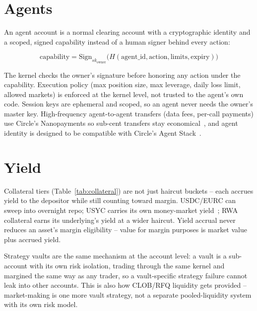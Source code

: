 \documentclass[11pt,a4paper]{article}
\begin{document}
\section{Agents}
\label{sec:agents}

An agent account is a normal clearing account with a cryptographic identity and a scoped, signed capability instead of a human signer behind every action:

\[
\text{capability} = \text{Sign}_{sk_{\text{owner}}}\big(H(\text{agent\_id}, \text{action}, \text{limits}, \text{expiry})\big)
\]

The kernel checks the owner's signature before honoring any action under the capability. Execution policy (max position size, max leverage, daily loss limit, allowed markets) is enforced at the kernel level, not trusted to the agent's own code. Session keys are ephemeral and scoped, so an agent never needs the owner's master key. High-frequency agent-to-agent transfers (data fees, per-call payments) use Circle's Nanopayments so sub-cent transfers stay economical~\cite{circle_nanopayments}, and agent identity is designed to be compatible with Circle's Agent Stack~\cite{circle_agent_stack}.

\section{Yield}
\label{sec:yield}

Collateral tiers (Table~\ref{tab:collateral}) are not just haircut buckets -- each accrues yield to the depositor while still counting toward margin. USDC/EURC can sweep into overnight repo; USYC carries its own money-market yield~\cite{usyc}; RWA collateral earns its underlying's yield at a wider haircut. Yield accrual never reduces an asset's margin eligibility -- value for margin purposes is market value plus accrued yield.

Strategy vaults are the same mechanism at the account level: a vault is a sub-account with its own risk isolation, trading through the same kernel and margined the same way as any trader, so a vault-specific strategy failure cannot leak into other accounts. This is also how CLOB/RFQ liquidity gets provided -- market-making is one more vault strategy, not a separate pooled-liquidity system with its own risk model.
\end{document}
